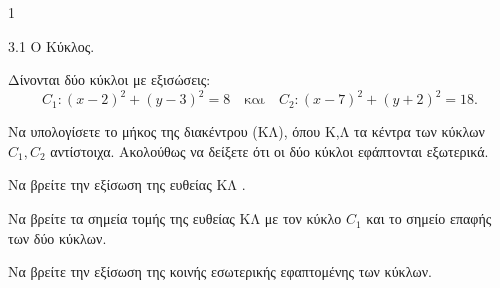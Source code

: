 \begin{ylh}{1}
    \item 3.1 Ο Κύκλος.
\end{ylh}
Δίνονται δύο κύκλοι με εξισώσεις:
\[
C_1:(x-2)^2+(y-3)^2=8 \quad \text{και} \quad C_2:(x-7)^2+(y+2)^2=18.
\]
\begin{alist}
\item Να υπολογίσετε το μήκος της διακέντρου (ΚΛ), όπου Κ,Λ τα κέντρα των κύκλων $C_1, C_2$ αντίστοιχα. Ακολούθως να δείξετε ότι οι δύο κύκλοι εφάπτονται εξωτερικά. 
\item
    \begin{rlist}
    \item Να βρείτε την εξίσωση της ευθείας ΚΛ . 
    \item Να βρείτε τα σημεία τομής της ευθείας ΚΛ με τον κύκλο $C_1$ και το σημείο επαφής των δύο κύκλων. 
    \end{rlist}
\item Να βρείτε την εξίσωση της κοινής εσωτερικής εφαπτομένης των κύκλων. 
\end{alist}